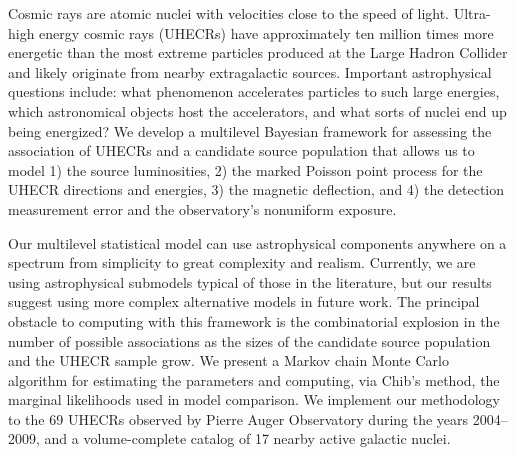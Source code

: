 \documentclass[12pt]{article}
\begin{document}
Cosmic rays are atomic nuclei with velocities close to the speed of light. Ultra-high energy cosmic rays (UHECRs) have approximately ten million times more energetic than the most extreme particles produced at the Large Hadron Collider and likely originate from nearby extragalactic sources. Important astrophysical questions include: what phenomenon accelerates particles to such large energies, which astronomical objects host the accelerators, and what sorts of nuclei end up being energized? We develop a multilevel Bayesian framework for assessing the association of UHECRs and a candidate source population that allows us to model
1) the source luminosities,
2) the marked Poisson point process for the UHECR directions and energies,
3) the magnetic deflection, and
4) the detection measurement error and the observatory's nonuniform exposure.

Our multilevel statistical model can use astrophysical components anywhere on a spectrum from simplicity to great complexity and realism.  Currently, we are using astrophysical submodels typical of those in the literature, but our results suggest using more complex alternative models in future work. The principal obstacle to computing with this framework is the combinatorial explosion in the number of possible associations as the sizes of the candidate source population and the UHECR sample grow. We present a Markov chain Monte Carlo algorithm for estimating the parameters and computing, via Chib's method, the marginal likelihoods used in model comparison. We implement our methodology to the 69 UHECRs observed by Pierre Auger Observatory during the years 2004--2009,
and a volume-complete catalog of 17 nearby active galactic nuclei.
\end{document}
